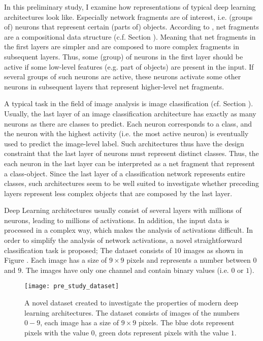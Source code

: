 In this preliminary study, I examine how representations of typical deep learning architectures look like.
Especially network fragments are of interest, i.e. (groups of) neurons that represent certain (parts of) objects.
According to , net fragments are a compositional data structure (c.f. Section ).
Meaning that net fragments in the first layers are simpler and are composed to more complex fragments in subsequent layers.
Thus, some (group) of neurons in the first layer should be active if some low-level features (e.g. part of objects) are present in the input.
If several groups of such neurons are active, these neurons activate some other neurons in subsequent layers that represent higher-level net fragments.

A typical task in the field of image analysis is image classification (cf. Section ).
Usually, the last layer of an image classification architecture has exactly as many neurons as there are classes to predict.
Each neuron corresponds to a class, and the neuron with the highest activity (i.e. the most active neuron) is eventually used to predict the image-level label.
Such architectures thus have the design constraint that the last layer of neurons must represent distinct classes.
Thus, the each neuron in the last layer can be interpreted as a net fragment that represent a class-object.
Since the last layer of a classification network represents entire classes, such architectures seem to be well suited to investigate whether preceding layers represent less complex objects that are composed by the last layer.

Deep Learning architectures usually consist of several layers with millions of neurons, leading to millions of activations.
In addition, the input data is processed in a complex way, which makes the analysis of activations difficult.
In order to simplify the analysis of network activations, a novel straightforward classification task is proposed;
The dataset consists of $10$ images as shown in Figure .
Each image has a size of $9\times9$ pixels and represents a number between $0$ and $9$.
The images have only one channel and contain binary values (i.e. $0$ or $1$).

\begin{figure}[h]
    \centering
    \texttt{[image: pre\_study\_dataset]}
    \caption[Straight Line Digits Dataset]{A novel dataset created to investigate the properties of modern deep learning architectures. The dataset consists of images of the numbers $0-9$, each image has a size of $9\times9$ pixels. The blue dots represent pixels with the value $0$, green dots represent pixels with the value $1$.}
\end{figure}

